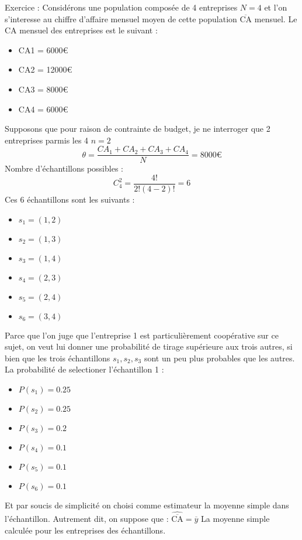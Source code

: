 \documentclass[a4paper]{article}
\begin{document}
Exercice :
Considérons une population composée de 4 entreprises $N = 4$ et l'on s'interesse au chiffre d'affaire mensuel moyen de cette population
$\overline{\text{CA}}$ mensuel. Le CA mensuel des entreprises est le suivant :
\begin{itemize}
    \item CA1 = 6000€
    \item CA2 = 12000€
    \item CA3 = 8000€
    \item CA4 = 6000€
\end{itemize}
Supposons que pour raison de contrainte de budget, je ne interroger que 2 entreprises parmis les 4 $n=2$
\begin{equation*}
    \theta = \frac{CA_1 + CA_2 + CA_3+CA_4}{N} = 8000 €  %
\end{equation*}
Nombre d'échantillons possibles :
\begin{equation*}
    C^2_4 = \frac{4!}{2!(4-2)!} = 6
\end{equation*}
Ces 6 échantillons sont les suivants : 
\begin{itemize}
    \item $s_1 = (1,2)$
    \item $s_2 = (1,3)$
    \item $s_3 = (1,4)$
    \item $s_4 = (2,3)$
    \item $s_5 = (2,4)$
    \item $s_6 = (3,4)$ 
\end{itemize}
Parce que l'on juge que l'entreprise 1 est particulièrement coopérative sur ce sujet, on veut lui donner une probabilité de tirage supérieure aux
trois autres, si bien que les trois échantillons $s_1, s_2, s_3$ sont un peu plus probables que les autres. La probabilité de selectioner
l'échantillon 1 : 
\begin{itemize}
    \item $P(s_1) = 0.25$
    \item $P(s_2) = 0.25$
    \item $P(s_3) = 0.2$
    \item $P(s_4) = 0.1$
    \item $P(s_5) = 0.1$
    \item $P(s_6) = 0.1$
\end{itemize}
Et par soucis de simplicité on choisi comme estimateur la moyenne simple dans l'échantillon. Autrement dit, on suppose que :
$\hat{\overline{\text{CA}}} = \overline{y}$ La moyenne simple calculée pour les entreprises des échantillons.
\end{document}
